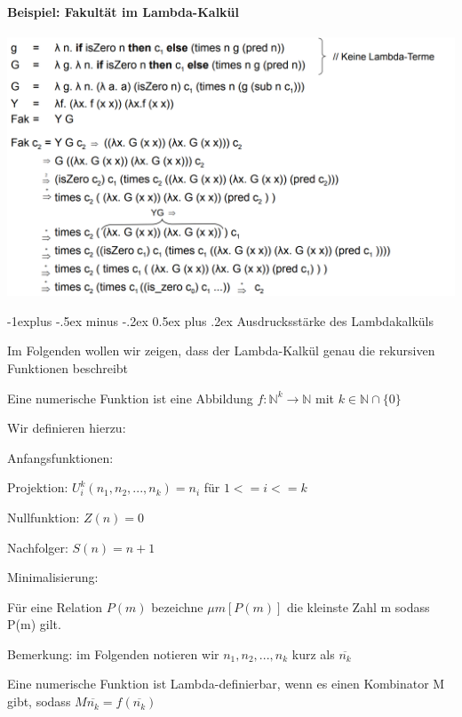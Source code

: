 \documentclass[10pt]{article}
\makeatletter
\renewcommand{\subsection}{\@startsection{subsection}{2}{0mm}%
                                {-1explus -.5ex minus -.2ex}%
                                {0.5ex plus .2ex}%
                                {\normalfont\normalsize\bfseries}}
\makeatother
\begin{document}
\paragraph{Beispiel: Fakultät im Lambda-Kalkül}
\includegraphics[width=.4\linewidth]{Assets/Programmierparadigmen-Lambda_Abstraktion}

\subsection{Ausdrucksstärke des Lambdakalküls}
\begin{itemize*}
  \item Im Folgenden wollen wir zeigen, dass der Lambda-Kalkül genau die rekursiven Funktionen beschreibt
  \item Eine numerische Funktion ist eine Abbildung $f:\mathbb{N}^k \rightarrow \mathbb{N}$ mit $k\in\mathbb{N} \cap \{0\}$
  \item Wir definieren hierzu:
  \begin{itemize*}
    \item Anfangsfunktionen:
    \begin{itemize*}
      \item Projektion: $U_i^k (n_1,n_2,...,n_k) = n_i$ für $1<=i<=k$
      \item Nullfunktion: $Z(n) = 0$
      \item Nachfolger: $S(n) = n+1$
    \end{itemize*}
    \item Minimalisierung:
    \begin{itemize*}
      \item Für eine Relation $P(m)$ bezeichne $\mu m[P(m)]$ die kleinste Zahl m sodass P(m) gilt.
    \end{itemize*}
  \end{itemize*}
  \item Bemerkung: im Folgenden notieren wir $n_1,n_2,...,n_k$ kurz als $\overline{n_k}$
  \item Eine numerische Funktion ist Lambda-definierbar, wenn es einen Kombinator M gibt, sodass $M\overline{n_k} = f(\overline{n_k})$
\end{itemize*}
\end{document}
